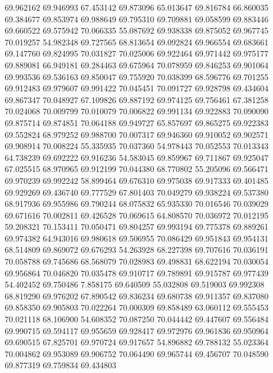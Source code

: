 69.962162
69.946993
67.453142
69.873096
65.013647
69.816784
66.860035
69.384677
69.853974
69.988649
69.795310
69.709881
69.058599
69.883446
69.660522
69.575942
70.066335
55.087692
69.938338
69.875052
69.967745
70.019257
54.982348
69.727565
68.813654
69.092824
69.966554
69.683661
69.147760
69.824995
70.031827
70.025006
69.922464
69.971442
69.975177
69.889081
66.949181
69.284463
69.675964
70.078959
69.846253
69.901064
69.993536
69.536163
69.850047
69.755920
70.038399
68.596776
69.701255
69.912483
69.979607
69.991422
70.045451
70.091727
69.928798
69.434604
69.867347
70.048927
67.109826
69.887192
69.974125
69.756461
67.381258
70.024068
70.009799
70.010079
70.006822
69.991134
69.922883
70.090090
69.875714
69.874851
70.064188
69.949727
65.857697
69.865275
69.922383
69.552824
68.979252
69.988700
70.007317
69.946360
69.910052
69.902571
69.908914
70.008224
55.335935
70.037360
54.978443
70.052553
70.013343
64.738239
69.692222
69.916236
54.583045
69.859967
69.711867
69.925047
67.025515
68.970965
69.912199
70.044380
68.770802
55.205096
69.566471
69.970239
69.992242
58.899464
69.676310
69.975038
69.917333
69.401485
69.929269
69.436740
69.777529
67.801403
70.049279
69.938224
69.537380
68.917936
69.955986
69.790244
68.075832
65.935330
70.016546
70.039029
69.671616
70.002811
69.426528
70.069615
64.808570
70.036972
70.012195
59.208321
70.153411
70.050471
69.804257
69.993194
69.775378
69.889261
69.974382
64.943016
69.980618
69.506955
70.086429
69.951843
69.954131
68.514809
69.869072
69.676293
54.263928
68.227398
69.707616
70.036191
70.058788
69.745686
68.568079
70.028983
69.498831
68.622194
70.030054
69.956864
70.046820
70.035478
69.910717
69.789891
69.915787
69.977439
54.402452
69.750486
7.858175
69.640509
55.032808
69.519003
69.992308
68.819290
69.976202
67.890542
69.836234
69.680738
69.911357
69.837080
69.858350
69.905803
70.022264
70.000309
69.858489
63.060112
69.555453
70.021118
68.106900
54.608352
70.087250
70.044442
69.447607
69.556484
69.990715
69.594117
69.955659
69.928417
69.972976
69.961836
69.950964
69.690515
67.825701
69.970724
69.917657
54.896882
69.788132
55.023364
70.004862
69.953089
69.906752
70.064490
69.965744
69.456707
70.048590
69.877319
69.759834
69.434803
